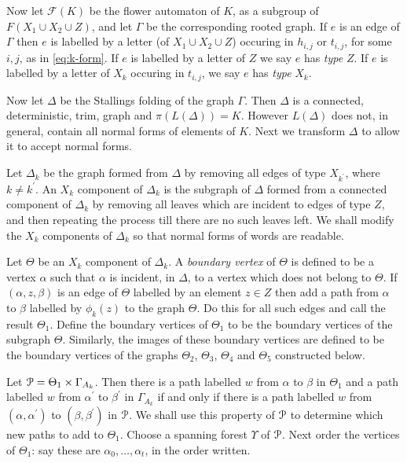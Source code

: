\documentclass[a4paper,12pt]{article}
\renewcommand{\a}{\alpha }
\renewcommand{\b}{\beta }
\newcommand{\G}{\Gamma }
\newcommand{\D}{\Delta }
\newcommand{\T}{\Theta }
\newcommand{\U}{\Upsilon }
\newcommand{\cF}{{\cal{F}}}
\newcommand{\cP}{{\cal{P}}}
\numberwithin{equation}{section}
\numberwithin{figure}{section}
\renewcommand{\cF}{\mathcal{F}}
\begin{document}
Now let $\cF(K)$ be the flower automaton of $K$, as a subgroup 
of $F(X_1\cup X_2 \cup Z)$, and let
$\G$ be the corresponding rooted graph. If $e$ is an edge of $\G$ then
$e$ is labelled by a letter (of $X_1\cup X_2 \cup Z$)
occuring in $h_{i,j}$ or $t_{i,j}$, for some $i,j$, as in
\eqref{eq:k-form}. If $e$ is labelled by a letter of $Z$ we say $e$ has {\em type} $Z$.
If $e$ is labelled by a letter of $X_k$ occuring in
$t_{i,j}$, we say $e$ has {\em type} $X_k$.

Now let $\D$ be the Stallings folding of the graph $\G$.  Then
 $\D$ is a connected, deterministic, trim, graph and $\pi(L(\D))=K$. However
$L(\D)$ does not, in general, contain all normal forms of elements of $K$.
Next we transform $\D$ to allow it to accept normal forms.


Let $\D_k$ be the graph formed from $\D$ by removing all edges of
type $X_{k^\prime}$, where $k\neq k^\prime$. An $X_k$ component of
$\D_k$ is the subgraph of $\D$ formed from a connected component
of $\D_k$ by removing all leaves which are incident to edges of
type $Z$, and then repeating the process till there are no such
leaves left.
 We shall modify the $X_k$ components of $\D_k$ so that normal forms of words
are readable.

Let $\T$ be an $X_k$ component of $\D_k$. A
{\em boundary vertex} of $\T$ is defined to be a vertex
$\a$ such that $\a$ is incident, in $\D$, to a vertex which does not
belong to $\T$.  If $(\a,z,\b)$ is an edge of
$\T$ labelled by an element $z\in Z$ then add a path from $\a$ to
$\b$ labelled by $\phi_k(z)$ to the graph $\T$. Do this for all such edges
and call the result $\T_1$.  Define the boundary vertices of $\T_1$ to be
the boundary vertices of the subgraph $\T$. Similarly, the images of these
boundary vertices are defined to be the boundary vertices of
the graphs $\T_2$, $\T_3$, $\T_4$ and $\T_5$ constructed
below.

 Let $\cP=\T_1\times \G_{A_k}$. Then there is a path
 labelled $w$ from $\a$ to $\b$
in $\T_1$ {\ef {$\T_1$?}}and a path labelled $w$ from $\a^\prime $
to $\b^\prime$ in $\G_{A_k}$ if and only if there is a path
labelled $w$ from $(\a,\a^\prime)$ to $(\b,\b^\prime)$ in $\cP$.
 We shall
use this property of $\cP$ to determine which new paths to add  to
$\T_1$. Choose a spanning  forest $\U$ of  $\cP$. Next
 order the vertices of
$\T_1$: say these are $\a_0,\ldots, \a_t$, in the order written.
\end{document}
